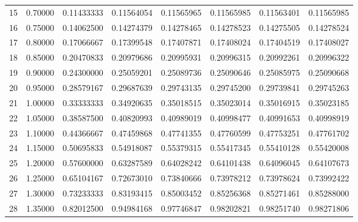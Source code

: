\begin{table}[H]
{\begin{tabular}{||c|c|c|c|c|c|c|c||}
			15 & 0.70000 & 0.11433333 & 0.11564054 & 0.11565965 & 0.11565985  & 0.11563401   & 0.11565985   \\
			16 & 0.75000 & 0.14062500 & 0.14274379 & 0.14278465 & 0.14278523  & 0.14275505   & 0.14278524   \\
			17 & 0.80000 & 0.17066667 & 0.17399548 & 0.17407871 & 0.17408024  & 0.17404519   & 0.17408027   \\
			18 & 0.85000 & 0.20470833 & 0.20979686 & 0.20995931 & 0.20996315  & 0.20992261   & 0.20996322   \\
			19 & 0.90000 & 0.24300000 & 0.25059201 & 0.25089736 & 0.25090646  & 0.25085975   & 0.25090668   \\
			20 & 0.95000 & 0.28579167 & 0.29687639 & 0.29743135 & 0.29745200  & 0.29739841   & 0.29745263   \\
			21 & 1.00000 & 0.33333333 & 0.34920635 & 0.35018515 & 0.35023014  & 0.35016915   & 0.35023185   \\
			22 & 1.05000 & 0.38587500 & 0.40820993 & 0.40989019 & 0.40998477  & 0.40991653   & 0.40998919   \\
			23 & 1.10000 & 0.44366667 & 0.47459868 & 0.47741355 & 0.47760599  & 0.47753251   & 0.47761702   \\
			24 & 1.15000 & 0.50695833 & 0.54918087 & 0.55379315 & 0.55417345  & 0.55410128   & 0.55420008   \\
			25 & 1.20000 & 0.57600000 & 0.63287589 & 0.64028242 & 0.64101438  & 0.64096045   & 0.64107673   \\
			26 & 1.25000 & 0.65104167 & 0.72673010 & 0.73840666 & 0.73978212  & 0.73978624   & 0.73992422   \\
			27 & 1.30000 & 0.73233333 & 0.83193415 & 0.85003452 & 0.85256368  & 0.85271461   & 0.85288000   \\
			28 & 1.35000 & 0.82012500 & 0.94984168 & 0.97746847 & 0.98202821  & 0.98251740   & 0.98271806   \\ \hline
			
		\end{tabular}
	}
	\label{table:testing}
\end{table}

